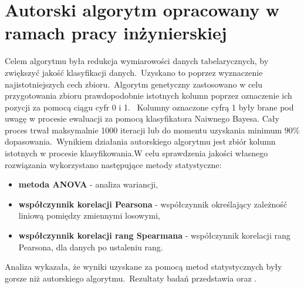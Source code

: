 \section{Autorski algorytm opracowany w ramach pracy inżynierskiej}
Celem algorytmu była redukcja wymiarowości danych tabelarycznych, by zwiększyć jakość klasyfikacji danych.\ Uzyskano to poprzez wyznaczenie najistotniejszych cech zbioru.\ Algorytm genetyczny zastosowano w celu przygotowania zbioru prawdopodobnie istotnych kolumn poprzez oznaczenie ich pozycji za pomocą ciągu cyfr 0 i 1.  \ Kolumny oznaczone cyfrą 1 były brane pod uwagę w procesie ewaluacji za pomocą klasyfikatora Naiwnego Bayesa. Cały proces trwał maksymalnie 1000 iteracji lub do momentu uzyskania minimum $90\%$ dopasowania.\ Wynikiem działania autorskiego algorytmu jest zbiór kolumn istotnych w procesie klasyfikowania.W celu sprawdzenia jakości  własnego rozwiązania wykorzystano następujące metody statystyczne:
\begin{itemize}
    \item \textbf{metoda ANOVA} - analiza wariancji,
    \item \textbf{współczynnik korelacji Pearsona} - współczynnik określający zależność liniową pomiędzy zmiennymi losowymi,
    \item \textbf{współczynnik korelacji rang Spearmana} - współczynnik korelacji rang Pearsona, dla danych po ustaleniu rang.
\end{itemize}

Analiza wykazała, że wyniki uzyskane za pomocą metod statystycznych były gorsze niż autorskiego algorytmu.\ Rezultaty badań przedstawia  oraz .\

